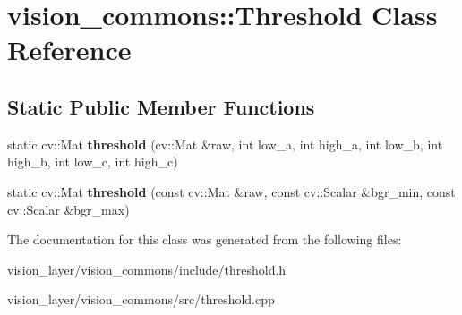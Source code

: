 \hypertarget{classvision__commons_1_1Threshold}{}\section{vision\+\_\+commons\+:\+:Threshold Class Reference}
\label{classvision__commons_1_1Threshold}
\subsection*{Static Public Member Functions}
\begin{DoxyCompactItemize}
\item 
\mbox{\label{classvision__commons_1_1Threshold_a63410bd74e4a866c110d593c6fee7b42}} 
static cv\+::\+Mat {\bfseries threshold} (cv\+::\+Mat \&raw, int low\+\_\+a, int high\+\_\+a, int low\+\_\+b, int high\+\_\+b, int low\+\_\+c, int high\+\_\+c)
\item 
\mbox{\label{classvision__commons_1_1Threshold_a08523cd43ea3b967c84eb1576d90fc09}} 
static cv\+::\+Mat {\bfseries threshold} (const cv\+::\+Mat \&raw, const cv\+::\+Scalar \&bgr\+\_\+min, const cv\+::\+Scalar \&bgr\+\_\+max)
\end{DoxyCompactItemize}


The documentation for this class was generated from the following files\+:\begin{DoxyCompactItemize}
\item 
vision\+\_\+layer/vision\+\_\+commons/include/threshold.\+h\item 
vision\+\_\+layer/vision\+\_\+commons/src/threshold.\+cpp\end{DoxyCompactItemize}
